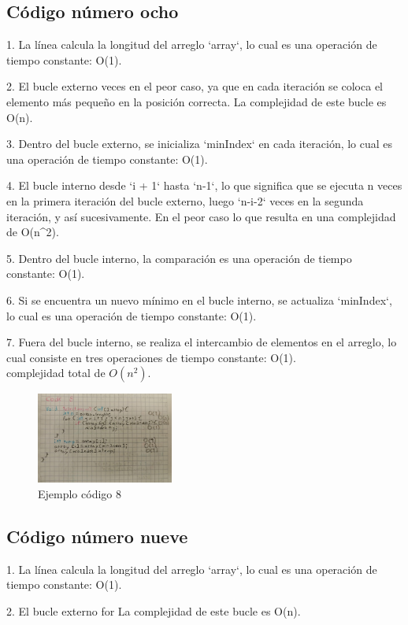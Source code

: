 \documentclass[journal, spanish]{IEEEtran}
\begin{document}
\subsection{Código número ocho}
1. La línea  calcula la longitud del arreglo `array`, lo cual es una operación de tiempo constante: O(1).

2. El bucle externo veces en el peor caso, ya que en cada iteración se coloca el elemento más pequeño en la posición correcta. La complejidad de este bucle es O(n).

3. Dentro del bucle externo, se inicializa `minIndex` en cada iteración, lo cual es una operación de tiempo constante: O(1).

4. El bucle interno desde `i + 1` hasta `n-1`, lo que significa que se ejecuta n veces en la primera iteración del bucle externo, luego `n-i-2` veces en la segunda iteración, y así sucesivamente. En el peor caso lo que resulta en una complejidad de O(n^2).

5. Dentro del bucle interno, la comparación es una operación de tiempo constante: O(1).

6. Si se encuentra un nuevo mínimo en el bucle interno, se actualiza `minIndex`, lo cual es una operación de tiempo constante: O(1).

7. Fuera del bucle interno, se realiza el intercambio de elementos en el arreglo, lo cual consiste en tres operaciones de tiempo constante: O(1).\\

complejidad total de $ O(n^2)$.
\begin{figure}[H]
  \centering
  \includegraphics[width=0.4\textwidth]{WhatsApp Image 2023-09-11 at 8.01.15 PM.jpeg}
  \caption{Ejemplo código 8}
  \label{fig:imagen1}
\end{figure}

\subsection{Código número nueve}
1. La línea calcula la longitud del arreglo `array`, lo cual es una operación de tiempo constante: O(1).

2. El bucle externo for La complejidad de este bucle es O(n).
\end{document}
